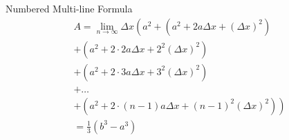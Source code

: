 \documentclass{beamer}
\begin{document}
\begin{frame}
    \begin{exampleblock}{Numbered Multi-line Formula}
        \begin{multline}
            A=\lim_{n\rightarrow\infty}\Delta x\left(a^{2}+\left(a^{2}+2a\Delta x+\left(\Delta x\right)^{2}\right)\right.\label{eq:reset}\\
            +\left(a^{2}+2\cdot2a\Delta x+2^{2}\left(\Delta x\right)^{2}\right)\\
            +\left(a^{2}+2\cdot3a\Delta x+3^{2}\left(\Delta x\right)^{2}\right)\\
            +\ldots\\
            \left.+\left(a^{2}+2\cdot(n-1)a\Delta x+(n-1)^{2}\left(\Delta x\right)^{2}\right)\right)\\
            =\frac{1}{3}\left(b^{3}-a^{3}\right)
        \end{multline}
    \end{exampleblock}
\end{frame}
\end{document}
